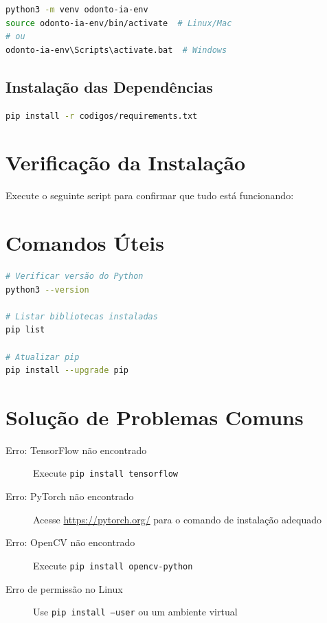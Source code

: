 \begin{lstlisting}[language=bash, numbers=none]
python3 -m venv odonto-ia-env
source odonto-ia-env/bin/activate  # Linux/Mac
# ou
odonto-ia-env\Scripts\activate.bat  # Windows
\end{lstlisting}

\subsection{Instalação das Dependências}

\begin{lstlisting}[language=bash, numbers=none]
pip install -r codigos/requirements.txt
\end{lstlisting}

\section{Verificação da Instalação}

Execute o seguinte script para confirmar que tudo está funcionando:




\section{Comandos Úteis}

\begin{lstlisting}[language=bash, numbers=none]
# Verificar versão do Python
python3 --version

# Listar bibliotecas instaladas
pip list

# Atualizar pip
pip install --upgrade pip
\end{lstlisting}

\section{Solução de Problemas Comuns}

\begin{description}
  \item[Erro: TensorFlow não encontrado]
    Execute \texttt{pip install tensorflow}
  \item[Erro: PyTorch não encontrado]
    Acesse \url{https://pytorch.org/} para o comando de instalação adequado
  \item[Erro: OpenCV não encontrado]
    Execute \texttt{pip install opencv-python}
  \item[Erro de permissão no Linux]
    Use \texttt{pip install --user} ou um ambiente virtual
\end{description}